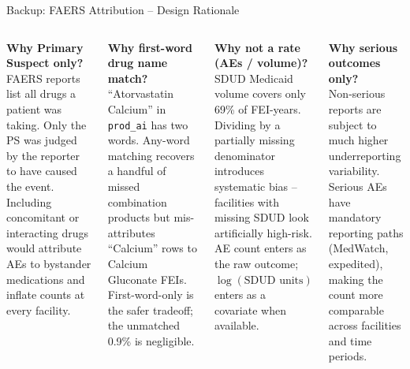 \documentclass[aspectratio=169,10pt]{beamer}
\begin{document}
\begin{frame}{Backup: FAERS Attribution -- Design Rationale}
\begin{columns}[T]
\textbf{Why Primary Suspect only?}\\[4pt]
FAERS reports list all drugs a patient was taking. Only the PS was judged by the reporter to have caused the event. Including concomitant or interacting drugs would attribute AEs to bystander medications and inflate counts at every facility.

\vspace{8pt}
\textbf{Why first-word drug name match?}\\[4pt]
``Atorvastatin Calcium'' in \texttt{prod\_ai} has two words. Any-word matching recovers a handful of missed combination products but mis-attributes ``Calcium'' rows to Calcium Gluconate FEIs. First-word-only is the safer tradeoff; the unmatched 0.9\% is negligible.

\textbf{Why not a rate (AEs / volume)?}\\[4pt]
SDUD Medicaid volume covers only 69\% of FEI-years. Dividing by a partially missing denominator introduces systematic bias -- facilities with missing SDUD look artificially high-risk. AE count enters as the raw outcome; $\log(\text{SDUD units})$ enters as a covariate when available.

\vspace{8pt}
\textbf{Why serious outcomes only?}\\[4pt]
Non-serious reports are subject to much higher underreporting variability. Serious AEs have mandatory reporting paths (MedWatch, expedited), making the count more comparable across facilities and time periods.
\end{columns}
\end{frame}
\end{document}
